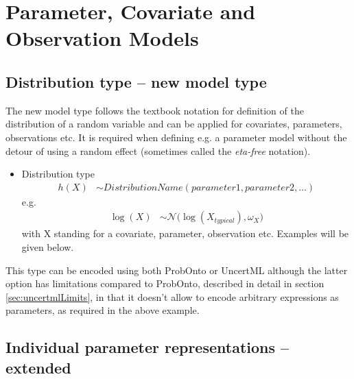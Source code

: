 %
\chapter{Parameter, Covariate and Observation Models}
\label{ch:Models}


\section{Distribution type -- new model type}
\label{sec:newModelType}
The new model type follows the textbook notation for definition of the distribution 
of a random variable and can be applied for covariates, parameters, observations etc.
It is required when defining e.g. a parameter model without the detour
of using a random effect (sometimes called the \emph{eta-free} notation). 
\begin{itemize}
\item
Distribution type
\begin{align*}
	h(X) & \sim DistributionName(parameter1, parameter2, \dots) 
\end{align*}
e.g. 
\begin{align*}
\log(X) & \sim \mathcal N\big(\log(X_{typical}), \omega_X\big)
\end{align*}
with X standing for a covariate, parameter, observation etc. Examples 
will be given below.
\end{itemize}
This type can be encoded using both ProbOnto or 
UncertML although the latter option has limitations compared to ProbOnto, 
described in detail in section \ref{sec:uncertmlLimits}, in that it doesn't allow 
to encode arbitrary expressions as parameters, as required in the above example.

\section{Individual parameter representations -- extended}
\label{sec:individualParameter}

